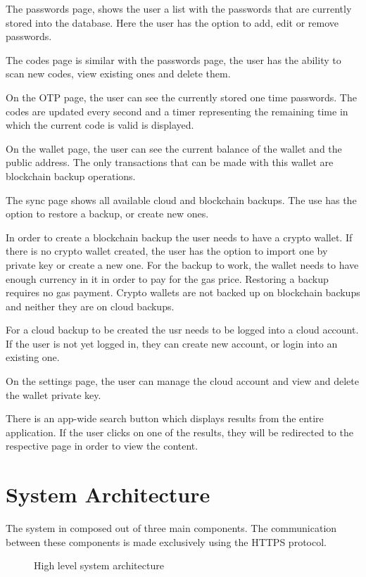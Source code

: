 \documentclass[a4paper,12pt]{report}
\begin{document}
The passwords page, shows the user a list with the passwords that are currently
stored into the database. Here the user has the option to add, edit or remove
passwords.

The codes page is similar with the passwords page, the user has the ability to
scan new codes, view existing ones and delete them.

On the OTP page, the user can see the currently stored one time passwords. The
codes are updated every second and a timer representing the remaining time in
which the current code is valid is displayed.

On the wallet page, the user can see the current balance of the wallet and the
public address. The only transactions that can be made with this wallet are
blockchain backup operations.

The sync page shows all available cloud and blockchain backups. The use has the
option to restore a backup, or create new ones.

In order to create a blockchain backup the user needs to have a crypto wallet.
If there is no crypto wallet created, the user has the option to import one by
private key or create a new one. For the backup to work, the wallet needs to
have enough currency in it in order to pay for the gas price. Restoring a
backup requires no gas payment. Crypto wallets are not backed up on blockchain
backups and neither they are on cloud backups.

For a cloud backup to be created the usr needs to be logged into a cloud
account. If the user is not yet logged in, they can create new account, or
login into an existing one.

On the settings page, the user can manage the cloud account and view and delete
the wallet private key.

There is an app-wide search button which displays results from the entire
application. If the user clicks on one of the results, they will be redirected
to the respective page in order to view the content.

\newpage
\section{System Architecture}

The system in composed out of three main components. The communication between
these components is made exclusively using the HTTPS protocol.

\begin{figure}[H]
    \centering
    \scalebox{0.499}{\large}
    \caption{High level system architecture}\label{fig:system}
\end{figure}
\end{document}
